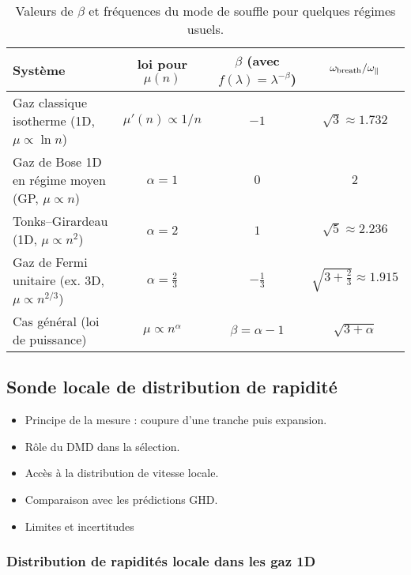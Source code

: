 \begin{table}[h]
\centering
\begin{tabular}{l c c c}
\hline
Système & loi pour $\mu(n)$ & $\beta$ (avec $f(\lambda)=\lambda^{-\beta}$) & $\displaystyle \omega_{\rm breath}/\omega_\parallel$ \\
\hline
Gaz classique isotherme (1D, $\mu\propto\ln n$) 
& $\mu'(n)\propto 1/n$ 
& $-1$ 
& $\sqrt{3}\approx1.732$ \\[4pt]

Gaz de Bose 1D en régime moyen (GP, $\mu\propto n$) 
& $\alpha=1$ 
& $0$ 
& $2$ \\[4pt]

Tonks--Girardeau (1D, $\mu\propto n^2$) 
& $\alpha=2$ 
& $1$ 
& $\sqrt{5}\approx2.236$ \\[4pt]

Gaz de Fermi unitaire (ex. 3D, $\mu\propto n^{2/3}$) 
& $\alpha=\tfrac{2}{3}$ 
& $-\tfrac{1}{3}$ 
& $\sqrt{3+\tfrac{2}{3}}\approx1.915$ \\[4pt]

Cas général (loi de puissance) 
& $\mu\propto n^\alpha$ 
& $\beta=\alpha-1$ 
& $\displaystyle \sqrt{3+\alpha}$ \\
\hline
\end{tabular}
\caption{Valeurs de $\beta$ et fréquences du mode de souffle pour quelques régimes usuels.}
\label{tab:breathing}
\end{table}
 



\subsection{Sonde locale de distribution de rapidité}
\begin{itemize}
    \item Principe de la mesure : coupure d’une tranche puis expansion.
    \item Rôle du DMD dans la sélection.
    \item Accès à la distribution de vitesse locale.
    \item Comparaison avec les prédictions GHD.
    \item Limites et incertitudes
\end{itemize}

\subsubsection{Distribution de rapidités locale dans les gaz 1D}

